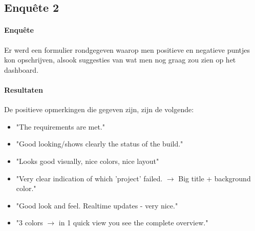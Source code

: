 \documentclass[10pt,a4paper]{article}
\begin{document}
\begin{appendices}
\clearpage

\section{Enqu\^ete 2}
\label{enquete2}
\paragraph{Enqu\^ete}
Er werd een formulier rondgegeven waarop men positieve en negatieve puntjes kon opschrijven, alsook suggesties van wat men nog graag zou zien op het dashboard.

\paragraph{Resultaten}
De positieve opmerkingen die gegeven zijn, zijn de volgende:
\begin{itemize}
\item "The requirements are met."
\item "Good looking/shows clearly the status of the build."
\item "Looks good visually, nice colors, nice layout"
\item "Very clear indication of which 'project' failed. $\rightarrow$ Big title + background color."
\item "Good look and feel. Realtime updates - very nice."
\item "3 colors $\rightarrow$ in 1 quick view you see the complete overview."
\end{itemize}


\end{appendices}
\end{document}
